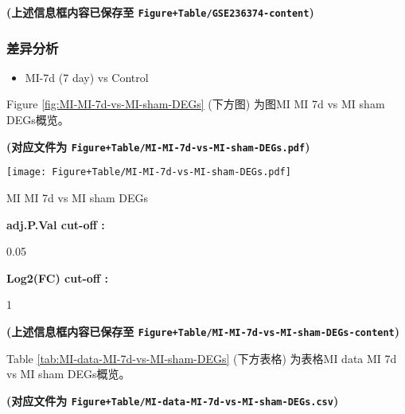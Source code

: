 \documentclass[
]{article}
\providecommand{\tightlist}{%
  \setlength{\itemsep}{0pt}\setlength{\parskip}{0pt}}
\begin{document}
\textbf{(上述信息框内容已保存至 \texttt{Figure+Table/GSE236374-content})}

\hypertarget{ux5deeux5f02ux5206ux6790}{%
\subsubsection{差异分析}\label{ux5deeux5f02ux5206ux6790}}

\begin{itemize}
\tightlist
\item
  MI-7d (7 day) vs Control
\end{itemize}

Figure \ref{fig:MI-MI-7d-vs-MI-sham-DEGs} (下方图) 为图MI MI 7d vs MI sham DEGs概览。

\textbf{(对应文件为 \texttt{Figure+Table/MI-MI-7d-vs-MI-sham-DEGs.pdf})}

\def\@captype{figure}
\begin{center}
\texttt{[image: Figure+Table/MI-MI-7d-vs-MI-sham-DEGs.pdf]}
\caption{MI MI 7d vs MI sham DEGs}\label{fig:MI-MI-7d-vs-MI-sham-DEGs}
\end{center}
\begin{center}\begin{tcolorbox}[colback=gray!10, colframe=gray!50, width=0.9\linewidth, arc=1mm, boxrule=0.5pt]
\textbf{
adj.P.Val cut-off
:}

\vspace{0.5em}

    0.05

\vspace{2em}


\textbf{
Log2(FC) cut-off
:}

\vspace{0.5em}

    1

\vspace{2em}
\end{tcolorbox}
\end{center}

\textbf{(上述信息框内容已保存至 \texttt{Figure+Table/MI-MI-7d-vs-MI-sham-DEGs-content})}

Table \ref{tab:MI-data-MI-7d-vs-MI-sham-DEGs} (下方表格) 为表格MI data MI 7d vs MI sham DEGs概览。

\textbf{(对应文件为 \texttt{Figure+Table/MI-data-MI-7d-vs-MI-sham-DEGs.csv})}
\end{document}
